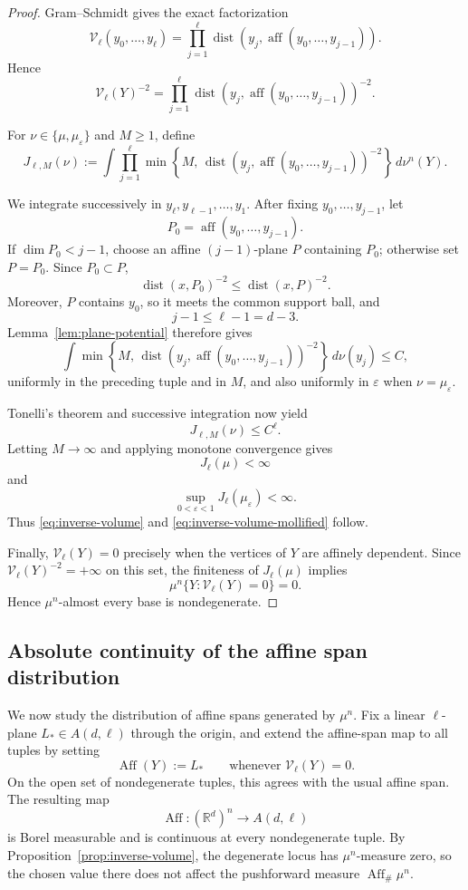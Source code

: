 \documentclass[11pt]{article}
\theoremstyle{remark}
\newcommand{\R}{\mathbb R}
\newcommand{\dist}{\operatorname{dist}}
\newcommand{\eps}{\varepsilon}
\numberwithin{equation}{section}
\newcommand{\1}{\mathbf 1}
\begin{document}
\begin{proof}
Gram--Schmidt gives the exact factorization
\begin{equation}
\mathcal V_\ell(y_0,\ldots,y_\ell)
=
\prod_{j=1}^\ell
\dist\!\left(
y_j,\operatorname{aff}(y_0,\ldots,y_{j-1})
\right).
\label{eq:GS-volume}
\end{equation}
Hence
\[
\mathcal V_\ell(Y)^{-2}
=
\prod_{j=1}^\ell
\dist\!\left(
y_j,\operatorname{aff}(y_0,\ldots,y_{j-1})
\right)^{-2}.
\]

For \(\nu\in\{\mu,\mu_\eps\}\) and \(M\geq1\), define
\[
J_{\ell,M}(\nu)
:=
\int
\prod_{j=1}^\ell
\min\!\left\{
M,\,
\dist\!\left(
y_j,\operatorname{aff}(y_0,\ldots,y_{j-1})
\right)^{-2}
\right\}
\,d\nu^n(Y).
\]

We integrate successively in \(y_\ell,y_{\ell-1},\ldots,y_1\).
After fixing \(y_0,\ldots,y_{j-1}\), let
\[
P_0=\operatorname{aff}(y_0,\ldots,y_{j-1}).
\]
If \(\dim P_0<j-1\), choose an affine \((j-1)\)-plane \(P\) containing
\(P_0\); otherwise set \(P=P_0\). Since \(P_0\subset P\),
\[
\dist(x,P_0)^{-2}\leq \dist(x,P)^{-2}.
\]
Moreover, \(P\) contains \(y_0\), so it meets the common support ball,
and
\[
j-1\leq \ell-1=d-3.
\]
Lemma~\ref{lem:plane-potential} therefore gives
\[
\int
\min\!\left\{
M,\,
\dist\!\left(
y_j,\operatorname{aff}(y_0,\ldots,y_{j-1})
\right)^{-2}
\right\}
\,d\nu(y_j)
\leq C,
\]
uniformly in the preceding tuple and in \(M\), and also uniformly in
\(\eps\) when \(\nu=\mu_\eps\).

Tonelli's theorem and successive integration now yield
\[
J_{\ell,M}(\nu)\leq C^\ell.
\]
Letting \(M\to\infty\) and applying monotone convergence gives
\[
J_\ell(\mu)<\infty
\]
and
\[
\sup_{0<\eps<1}J_\ell(\mu_\eps)<\infty.
\]
Thus \eqref{eq:inverse-volume} and
\eqref{eq:inverse-volume-mollified} follow.

Finally, \(\mathcal V_\ell(Y)=0\) precisely when the vertices of \(Y\)
are affinely dependent. Since
\(\mathcal V_\ell(Y)^{-2}=+\infty\) on this set, the finiteness of
\(J_\ell(\mu)\) implies
\[
\mu^n\{Y:\mathcal V_\ell(Y)=0\}=0.
\]
Hence \(\mu^n\)-almost every base is nondegenerate.
\end{proof}

\subsection{Absolute continuity of the affine span distribution}

We now study the distribution of affine spans generated by \(\mu^n\).
Fix a linear \(\ell\)-plane \(L_\ast\in A(d,\ell)\) through the origin,
and extend the affine-span map to all tuples by setting
\[
\operatorname{Aff}(Y):=L_\ast
\qquad\text{whenever }\mathcal V_\ell(Y)=0.
\]
On the open set of nondegenerate tuples, this agrees with the usual
affine span. The resulting map
\[
\operatorname{Aff}:(\R^d)^n\longrightarrow A(d,\ell)
\]
is Borel measurable and is continuous at every nondegenerate tuple.
By Proposition~\ref{prop:inverse-volume}, the degenerate locus has
\(\mu^n\)-measure zero, so the chosen value there does not affect the
pushforward measure \(\operatorname{Aff}_\#\mu^n\).
\end{document}
